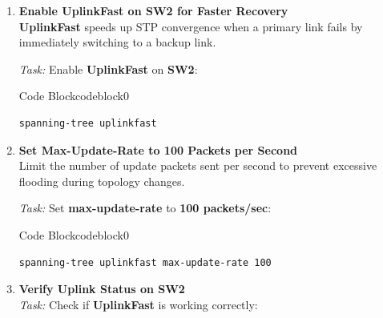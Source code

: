 \documentclass[a4paper]{book}
\begin{document}
\begin{enumerate}
	      \textit{Task:} Verify \textbf{Forward Delay} and \textbf{Max Age} settings:



	      \begin{ocg}{Code Block}{codeblock}{0}
		      \vspace{0.5cm}
		      \begin{lstlisting}
show spanning-tree vlan [VLAN-ID]
            \end{lstlisting}
	      \end{ocg}

	\item \textbf{Enable UplinkFast on SW2 for Faster Recovery} \\
	      \textbf{UplinkFast} speeds up STP convergence when a primary link fails by immediately switching to a backup link.

	      \textit{Task:} Enable \textbf{UplinkFast} on \textbf{SW2}:



	      \begin{ocg}{Code Block}{codeblock}{0}
		      \vspace{0.5cm}
		      \begin{lstlisting}
spanning-tree uplinkfast
            \end{lstlisting}
	      \end{ocg}

	\item \textbf{Set Max-Update-Rate to 100 Packets per Second} \\
	      Limit the number of update packets sent per second to prevent excessive flooding during topology changes.

	      \textit{Task:} Set \textbf{max-update-rate} to \textbf{100 packets/sec}:



	      \begin{ocg}{Code Block}{codeblock}{0}
		      \vspace{0.5cm}
		      \begin{lstlisting}
spanning-tree uplinkfast max-update-rate 100
          \end{lstlisting}
	      \end{ocg}
	\item \textbf{Verify Uplink Status on SW2} \\
	      \textit{Task:} Check if \textbf{UplinkFast} is working correctly:


\end{enumerate}
\end{document}
